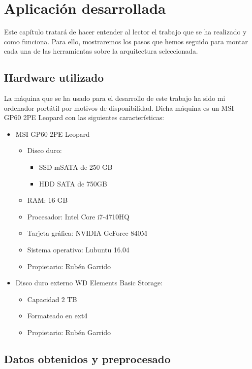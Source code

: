 \section {Aplicación desarrollada\label{desarrollo}}

Este capítulo tratará de hacer entender al lector el trabajo que se ha realizado y como funciona. Para ello, mostraremos los pasos que hemos seguido para montar cada una de las herramientas sobre la arquitectura seleccionada. 

\subsection {Hardware utilizado\label{hardware}}

La máquina que se ha usado para el desarrollo de este trabajo ha sido mi ordenador portátil por motivos de disponibilidad. Dicha máquina es un MSI GP60 2PE Leopard con las siguientes características:\par
\begin{itemize}
	\item MSI GP60 2PE Leopard
	\begin{itemize}
		\item Disco duro:
		\begin{itemize}
			\item SSD mSATA de 250 GB
			\item HDD SATA de 750GB
		\end{itemize}
		\item RAM: 16 GB
		\item Procesador: Intel Core i7-4710HQ
		\item Tarjeta gráfica: NVIDIA GeForce 840M
		\item Sistema operativo: Lubuntu 16.04
		\item Propietario: Rubén Garrido
	\end{itemize}
	\item Disco duro externo WD Elements Basic Storage:
	\begin{itemize}
			\item Capacidad 2 TB
			\item Formateado en ext4
			\item Propietario: Rubén Garrido
	\end{itemize}
\end{itemize}

\subsection {Datos obtenidos y preprocesado\label{datos}}

